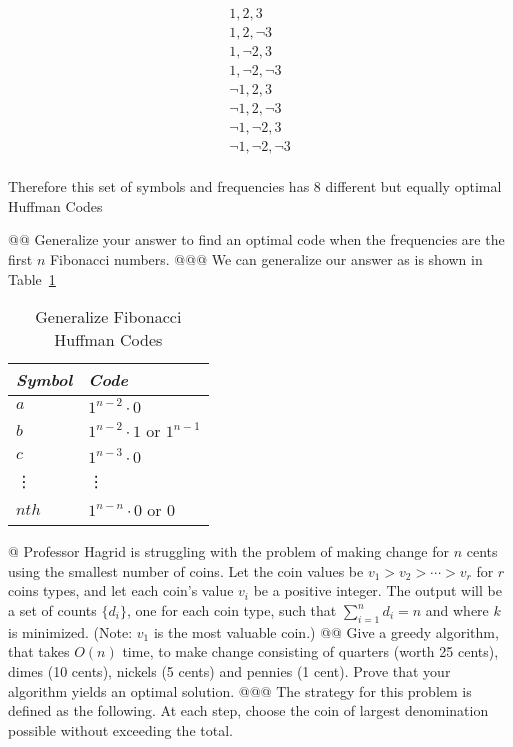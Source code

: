 \documentclass[10pt]{article}
\begin{document}
\begin{easylist}[enumerate]
        \[ \begin{aligned}
            1,2,3\\
            1,2,\neg 3\\
            1,\neg 2,3\\
            1,\neg 2,\neg 3\\
            \neg1,2,3\\
            \neg 1,2,\neg 3\\
            \neg 1,\neg 2, 3\\
            \neg 1,\neg 2,\neg 3\\
        \end{aligned} \]

    Therefore this set of symbols and frequencies has 8 different but equally optimal Huffman Codes

    @@ Generalize your answer to find an optimal code when the frequencies are the first $n$ Fibonacci numbers.
    @@@ We can generalize our answer as is shown in Table~\ref{table:codesymbols}

    \begin{table}[!ht]
        \centering
        \begin{tabular}{|l|l|}
             \hline
             \textit{Symbol} & \textit{Code}\\
             \hline
             $a$             & $1^{n-2} \cdot 0$\\
             $b$             & $1^{n-2} \cdot 1$ or $1^{n-1}$\\
             $c$             & $1^{n-3} \cdot 0$\\
             \vdots          & \vdots\\
             $nth$           & $1^{n-n} \cdot 0$ or $0$\\
             \hline
        \end{tabular}
        \caption{Generalize Fibonacci Huffman Codes}
        \label{table:codesymbols}
    \end{table}

    @ Professor Hagrid is struggling with the problem of making change for $n$ cents using the smallest number of coins.
    Let the coin values be $v_1 > v_2 > \cdots > v_r$ for $r$ coins types, and let each coin's value $v_i$ be a positive
    integer. The output will be a set of counts $\{d_i\}$, one for each coin type, such that $\sum^n_{i=1} d_i = n$ and
    where $k$ is minimized. (Note: $v_ 1$ is the most valuable coin.)
    @@ Give a greedy algorithm, that takes $O(n)$ time, to make change consisting of quarters (worth 25 cents), dimes
    (10 cents), nickels (5 cents) and pennies (1 cent). Prove that your algorithm yields an optimal solution.
    @@@ The strategy for this problem is defined as the following. At each step, choose the coin of largest denomination
    possible without exceeding the total.


\end{easylist}
\end{document}
